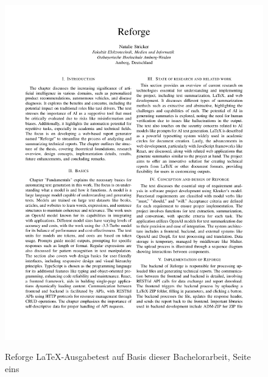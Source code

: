\begin{figure}[H]
\centering
\includegraphics[width=1\linewidth]{Images/ReforgeTestGen1.pdf}\\
\caption{Reforge LaTeX-Ausgabetest auf Basis dieser Bachelorarbeit, Seite eins}
\label{fig:Reforge_testgen1}
\end{figure}

